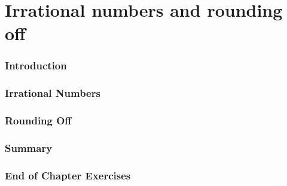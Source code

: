          \chapter{Irrational numbers and rounding off}
    \subsection{ Introduction}
    \subsection{ Irrational Numbers}
    \subsection{ Rounding Off}
    \subsection{ Summary}
        \subsection{ End of Chapter Exercises}
